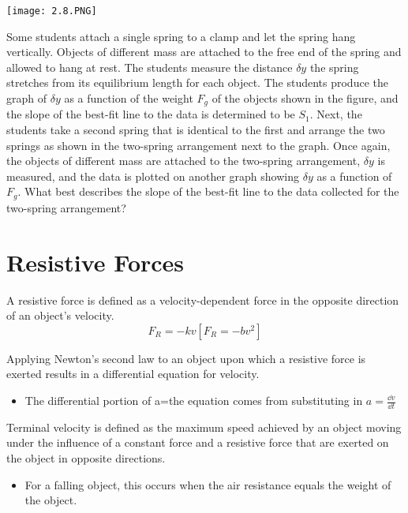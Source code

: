 \documentclass[../mech.tex]{subfiles}
\begin{document}
\ex \begin{center}
    \texttt{[image: 2.8.PNG]}
\end{center}
Some students attach a single spring to a clamp and let the spring hang vertically. Objects of different mass are attached to the free end of the spring and allowed to hang at rest. The students measure the 
distance $\delta y$ the spring stretches from its equilibrium length for each object. The students produce the graph of $\delta y$ as a function of the weight $F_g$ of the objects shown in the figure, and the slope of the best-fit line to the data is determined to be 
$S_1$. Next, the students take a second spring that is identical to the first and arrange the two springs as shown in the two-spring arrangement next to the graph. Once again, the objects of different mass are attached to the two-spring arrangement,
$\delta y$ is measured, and the data is plotted on another graph showing $\delta y$ as a function of $F_g$. What best describes the slope of the best-fit line to the data collected for the two-spring arrangement?

\section{Resistive Forces}
A resistive force is defined as a velocity-dependent force in the opposite direction of an object's velocity.
\[ F_R=-kv [F_R=-bv^2] \]

Applying Newton's second law to an object upon which a resistive force is exerted results in a differential equation for velocity.
\begin{itemize}
    \item The differential portion of a=the equation comes from substituting in $a=\frac{\dd v}{\dd t}$
\end{itemize}

Terminal velocity is defined as the maximum speed achieved by an object moving under the influence of a constant force and a resistive force that are exerted on the object in opposite directions.
\begin{itemize}
    \item For a falling object, this occurs when the air resistance equals the weight of the object.
\end{itemize}
\end{document}
